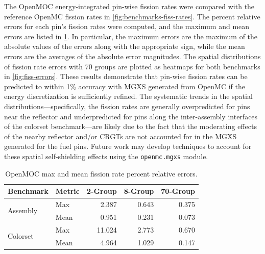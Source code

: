 The OpenMOC energy-integrated pin-wise fission rates were compared with the reference OpenMC fission rates in \cref{fig:benchmarks-fiss-rates}. The percent relative errors for each pin's fission rates were computed, and the maximum and mean errors are listed in \cref{tab:fiss-errors}. In particular, the maximum errors are the maximum of the absolute values of the errors along with the appropriate sign, while the mean errors are the averages of the absolute error magnitudes. The spatial distributions of fission rate errors with 70 groups are plotted as heatmaps for both benchmarks in \cref{fig:fiss-errors}. These results demonstrate that pin-wise fission rates can be predicted to within 1\% accuracy with MGXS generated from OpenMC if the energy discretization is sufficiently refined. The systematic trends in the spatial distributions---specifically, the fission rates are generally overpredicted for pins near the reflector and underpredicted for pins along the inter-assembly interfaces of the colorset benchmark---are likely due to the fact that the moderating effects of the nearby reflector and/or CRGTs are not accounted for in the MGXS generated for the fuel pins. Future work may develop techniques to account for these spatial self-shielding effects using the \texttt{openmc.mgxs} module.

\begin{table}[h!]
  \centering
  \caption{OpenMOC max and mean fission rate percent relative errors.}
  \label{tab:fiss-errors}
  \begin{tabular}{l l r r r}
  \toprule
  \textbf{Benchmark} & \textbf{Metric} & \textbf{2-Group} & \textbf{8-Group} & \textbf{70-Group} \\
  \midrule
  \multirow{2}{*}{Assembly} & Max  & 2.387 & 0.643 & 0.375 \\
                            & Mean & 0.951 & 0.231 & 0.073 \\
  \midrule
  \multirow{2}{*}{Colorset} & Max  & 11.024 & 2.773 & 0.670 \\
                            & Mean & 4.964  & 1.029 & 0.147 \\
  \bottomrule
\end{tabular}
\end{table}

